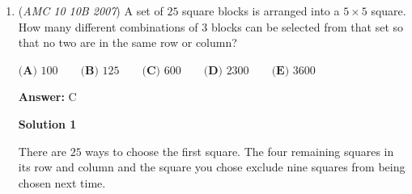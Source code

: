\begin{enumerate}
 
Next we isolate the rows numbered 3 or 4. Note that the probability of picking the rows is same, because of our list up above. The columns, of course, still have the same probability. Because the number of shaded and non-shaded squares are equal, we have 
 \[\frac{1}{2}\]Combining these we have a general probability of  
 \[\boxed{\textbf{(C)} \frac{1}{2}}\]




\textbf{Solution 3}

Similarly to Solution 1, we create two lists, one for $mod$ $4$ and one for $mod$ $5$ : ($1, 2, 3, 2, 3, 1$) and ($1, 2, 3, 1, 2, 4$). Next, we make a list of the coordinates we want for the shaded boxes. ($1,1$), ($1,3$), ($2,2$), ($3,1$), ($3,3$), ($2,4$). For each coordinate pair, we find the probability for it to occur. In order, we get $\frac{1}{9}, \frac{1}{18}, \frac{1}{9}, \frac{1}{9}, \frac{1}{18}, \frac{1}{18}$. Sum these to get the answer of $\boxed{\textbf{(C)} \frac{1}{2}}$




\textbf{Solution 4}

We take everything modulo $4$ first. We get $1$ mod $4$, $2$ mod $4$, $3$ mod $4$, twice. Therefore, the probability of any given column is equal. We take everything modulo $5$ now. We have $1, 2, 3, 1, 2, 4$ mod $5$. $1$ and $2$ are different colored squares, and $3$ and $4$ are also different colored squares. Therefore, every single one of them has the same probability. 

 Therefore, our probability for a white square or a shaded square is equal, and therefore, the probability the square is shaded $\boxed {(C)\frac {1}{2}}$



	\item (\textit{AMC 10 10B 2007}) A set of $25$ square blocks is arranged into a $5 \times 5$ square. How many different combinations of $3$ blocks can be selected from that set so that no two are in the same row or column?


 $\textbf{(A) } 100 \qquad\textbf{(B) } 125 \qquad\textbf{(C) } 600 \qquad\textbf{(D) } 2300 \qquad\textbf{(E) } 3600$

 \textbf{Answer: }C



\textbf{Solution 1}

There are $25$ ways to choose the first square. The four remaining squares in its row and column and the square you chose exclude nine squares from being chosen next time.


\end{enumerate}
